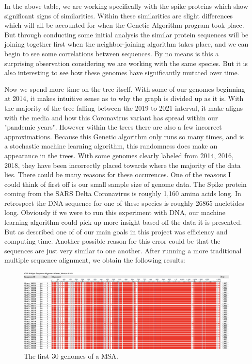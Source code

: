 In the above table, we are working specifically with the spike proteins which show significant signs of similarities. Within these similarities are slight differences which will all be accounted for when the Genetic Algorithm program took place. But through conducting some initial analysis the similar protein sequences will be joining together first when the neighbor-joining algorithm takes place, and we can begin to see some correlations between sequences. By no means is this a surprising observation considering we are working with the same species. But it is also interesting to see how these genomes have significantly mutated over time.  
   
Now we spend more time on the tree itself. With some of our genomes beginning at 2014, it makes intuitive sense as to why the graph is divided up as it is. With the majority of the tree falling between the 2019 to 2021 interval, it make aligns with the media and how this Coronavirus variant has spread within our "pandemic years". However within the trees there are also a few incorrect approximations. Because this Genetic algorithm only runs so many times, and is a stochastic machine learning algorithm, this randomness does make an appearance in the trees. With some genomes clearly labeled from 2014, 2016, 2018, they have been incorrectly placed towards where the majority of the data lies. There could be many reasons for these occurences. One of the reasons I could think of first off is our small sample size of genome data. The Spike protein coming from the SARS Delta Coronavirus is roughly 1,160 amino acids long. In retrospect the DNA sequence for one of these species is roughly 26865 nucletides long. Obviously if we were to run this experiment with DNA, our machine learning algorithm could pick up more insight based off the data it is presented. But as described one of of our main goals in this project was efficiency and computing time. Another possible reason for this error could be that the sequences are just very similar to one another. After running a more traditional multiple sequence alignment, we obtain the following results:

\begin{figure}[H]
\centering
\includegraphics[width=.9\textwidth]{figures/sa2.png}
\caption{The first 30 genomes of a MSA.}
\end{figure}

